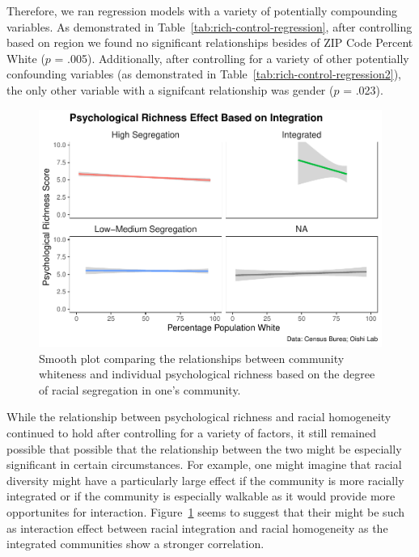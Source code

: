 \documentclass[
  man,floatsintext]{apa7}
\begin{document}
Therefore, we ran regression models with a variety of potentially compounding variables. As demonstrated in Table~\ref{tab:rich-control-regression}, after controlling based on region we found no significant relationships besides of ZIP Code Percent White (\(p\) = .005). Additionally, after controlling for a variety of other potentially confounding variables (as demonstrated in Table~\ref{tab:rich-control-regression2}), the only other variable with a signifcant relationship was gender (\(p\) = .023).



\begin{figure}[H]
\includegraphics[width=1\linewidth]{Richness-Diversity-Markdown_files/figure-latex/g-path-smooth-1} \caption{Smooth plot comparing the relationships between community whiteness and individual psychological richness based on the degree of racial segregation in one's community.}\label{fig:g-path-smooth}
\end{figure}

While the relationship between psychological richness and racial homogeneity continued to hold after controlling for a variety of factors, it still remained possible that possible that the relationship between the two might be especially significant in certain circumstances. For example, one might imagine that racial diversity might have a particularly large effect if the community is more racially integrated or if the community is especially walkable as it would provide more opportunites for interaction. Figure~\ref{fig:g-path-smooth} seems to suggest that their might be such as interaction effect between racial integration and racial homogeneity as the integrated communities show a stronger correlation.
\end{document}
